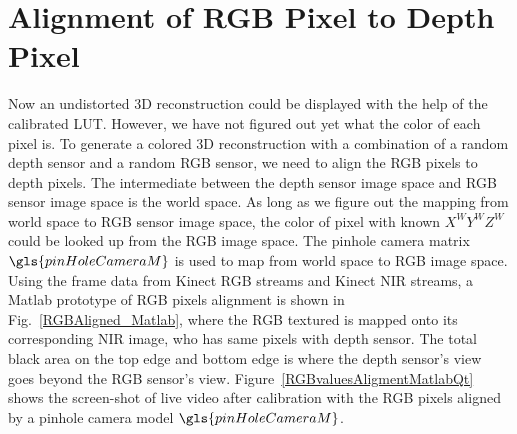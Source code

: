 \section{Alignment of RGB Pixel to Depth Pixel}
Now an undistorted \gls{3D} reconstruction could be displayed with the help of the calibrated \gls{LUT}. However, we have not figured out yet what the color of each pixel is. To generate a colored \gls{3D} reconstruction with a combination of a random depth sensor and a random RGB sensor, we need to align the RGB pixels to depth pixels. The intermediate between the depth sensor image space and RGB sensor image space is the world space. As long as we figure out the mapping from world space to RGB sensor image space, the color of pixel with known \(X^WY^WZ^W\) could be looked up from the RGB image space. The pinhole camera matrix \(\gls{pinHoleCameraM}\) is used to map from world space to RGB image space. Using the frame data from Kinect RGB streams and Kinect \gls{NIR} streams, a Matlab prototype of RGB pixels alignment is shown in Fig.~\ref{RGBAligned_Matlab}, where the RGB textured is mapped onto its corresponding \gls{NIR} image, who has same pixels with depth sensor. The total black area on the top edge and bottom edge is where the depth sensor's view goes beyond the RGB sensor's view. Figure~\ref{RGBvaluesAligmentMatlabQt} shows the screen-shot of live video after calibration with the RGB pixels aligned by a pinhole camera model \(\gls{pinHoleCameraM}\).

